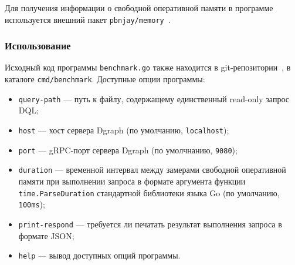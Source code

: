 Для получения информации о свободной оперативной памяти в программе используется внешний пакет
\texttt{pbnjay/memory}~\cite{pbnjayMemory}.

\subsubsection{Использование}

Исходный код программы \texttt{benchmark.go} также находится в git-репозитории~\cite{sources}, в каталоге
\texttt{cmd/benchmark}. Доступные опции программы:
\begin{itemize}
  \item \texttt{query-path} --- путь к файлу, содержащему единственный read-only запрос DQL;
  \item \texttt{host} --- хост сервера Dgraph (по умолчанию, \texttt{localhost});
  \item \texttt{port} --- gRPC-порт сервера Dgraph (по умолчнанию, \texttt{9080});
  \item \texttt{duration} --- временной интервал между замерами свободной оперативной памяти при выполнении запроса в
    формате аргумента функции \texttt{time.ParseDuration} стандартной библиотеки языка Go (по умолчанию,
    \texttt{100ms});
  \item \texttt{print-respond} --- требуется ли печатать результат выполнения запроса в формате JSON;
  \item \texttt{help} --- вывод доступных опций программы.
\end{itemize}
